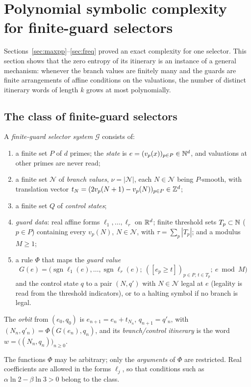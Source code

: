 
\section{Polynomial symbolic complexity for finite-guard selectors}\label{sec:complexity}
Sections~\ref{sec:maxpp}--\ref{sec:freq} proved an exact complexity for one selector. This section shows that the zero entropy of its itinerary is an instance of a general mechanism: whenever the branch values are finitely many and the guards are finite arrangements of affine conditions on the valuations, the number of distinct itinerary words of length $k$ grows at most polynomially.

\subsection{The class of finite-guard selectors}
\begin{definition}\label{def:finite-guard}
A \emph{finite-guard selector system} $\mathcal G$ consists of:
\begin{enumerate}[label=(\alph*),itemsep=1pt]
\item a finite set $P$ of $d$ primes; the \emph{state} is $e=(v_p(x))_{p\in P}\in\mathbb{N}^d$, and valuations at other primes are never read;
\item a finite set $\mathcal N$ of \emph{branch values}, $\nu=|\mathcal N|$, each $N\in\mathcal N$ being $P$-smooth, with translation vector $t_N=(2v_p(N+1)-v_p(N))_{p\in P}\in\mathbb{Z}^d$;
\item a finite set $Q$ of \emph{control states};
\item \emph{guard data}: real affine forms $\ell_1,\dots,\ell_r$ on $\mathbb{R}^d$; finite threshold sets $T_p\subset\mathbb{N}$ ($p\in P$) containing every $v_p(N)$, $N\in\mathcal N$, with $\tau=\sum_p|T_p|$; and a modulus $M\ge1$;
\item a rule $\Phi$ that maps the \emph{guard value}
\[
G(e)=\bigl(\operatorname{sgn}\ell_1(e),\dots,\operatorname{sgn}\ell_r(e);\ ([e_p\ge t])_{p\in P,\,t\in T_p};\ e\bmod M\bigr)
\]
and the control state $q$ to a pair $(N,q')$ with $N\in\mathcal N$ legal at $e$ (legality is read from the threshold indicators), or to a halting symbol if no branch is legal.
\end{enumerate}
The \emph{orbit} from $(e_0,q_0)$ is $e_{n+1}=e_n+t_{N_n}$, $q_{n+1}=q'_n$, with $(N_n,q'_n)=\Phi(G(e_n),q_n)$, and its \emph{branch/control itinerary} is the word $w=\bigl((N_n,q_n)\bigr)_{n\ge0}$.
\end{definition}
The functions $\Phi$ may be arbitrary; only the \emph{arguments} of $\Phi$ are restricted. Real coefficients are allowed in the forms $\ell_j$, so that conditions such as $\alpha\ln2-\beta\ln3>0$ belong to the class.

